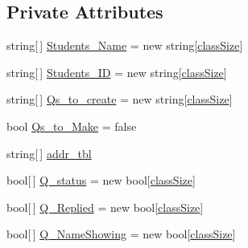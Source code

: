 \subsection*{\-Private \-Attributes}
\begin{DoxyCompactItemize}
\item 
string\mbox{[}$\,$\mbox{]} \hyperlink{class_sr_p___classroom_inq_1_1frm_classrrom_inq_ad595ee0cb55235eda789723fe8967521}{\-Students\-\_\-\-Name} = new string\mbox{[}\hyperlink{class_sr_p___classroom_inq_1_1frm_classrrom_inq_a78d9aab335edfe53d39036b9d89928a8}{class\-Size}\mbox{]}
\item 
string\mbox{[}$\,$\mbox{]} \hyperlink{class_sr_p___classroom_inq_1_1frm_classrrom_inq_a68a93f6247168ebfa500f7afe83cce94}{\-Students\-\_\-\-I\-D} = new string\mbox{[}\hyperlink{class_sr_p___classroom_inq_1_1frm_classrrom_inq_a78d9aab335edfe53d39036b9d89928a8}{class\-Size}\mbox{]}
\item 
string\mbox{[}$\,$\mbox{]} \hyperlink{class_sr_p___classroom_inq_1_1frm_classrrom_inq_a04ea330233515e3af7d23fcd501364cc}{\-Qs\-\_\-to\-\_\-create} = new string\mbox{[}\hyperlink{class_sr_p___classroom_inq_1_1frm_classrrom_inq_a78d9aab335edfe53d39036b9d89928a8}{class\-Size}\mbox{]}
\item 
bool \hyperlink{class_sr_p___classroom_inq_1_1frm_classrrom_inq_a74b0b2afc18cdf1d19dc415ab870e68b}{\-Qs\-\_\-to\-\_\-\-Make} = false
\item 
string\mbox{[}$\,$\mbox{]} \hyperlink{class_sr_p___classroom_inq_1_1frm_classrrom_inq_a0f417902be6534cb30d93b2c0d836165}{addr\-\_\-tbl}
\item 
bool\mbox{[}$\,$\mbox{]} \hyperlink{class_sr_p___classroom_inq_1_1frm_classrrom_inq_ae02a7c8f440963717ee0cf2f74d4d56a}{\-Q\-\_\-status} = new bool\mbox{[}\hyperlink{class_sr_p___classroom_inq_1_1frm_classrrom_inq_a78d9aab335edfe53d39036b9d89928a8}{class\-Size}\mbox{]}
\item 
bool\mbox{[}$\,$\mbox{]} \hyperlink{class_sr_p___classroom_inq_1_1frm_classrrom_inq_af7c089d129d15a45c05bede3e9554f58}{\-Q\-\_\-\-Replied} = new bool\mbox{[}\hyperlink{class_sr_p___classroom_inq_1_1frm_classrrom_inq_a78d9aab335edfe53d39036b9d89928a8}{class\-Size}\mbox{]}
\item 
bool\mbox{[}$\,$\mbox{]} \hyperlink{class_sr_p___classroom_inq_1_1frm_classrrom_inq_a717931be8f79e53cf69e10515df3115e}{\-Q\-\_\-\-Name\-Showing} = new bool\mbox{[}\hyperlink{class_sr_p___classroom_inq_1_1frm_classrrom_inq_a78d9aab335edfe53d39036b9d89928a8}{class\-Size}\mbox{]}
\item 

\end{DoxyCompactItemize}

